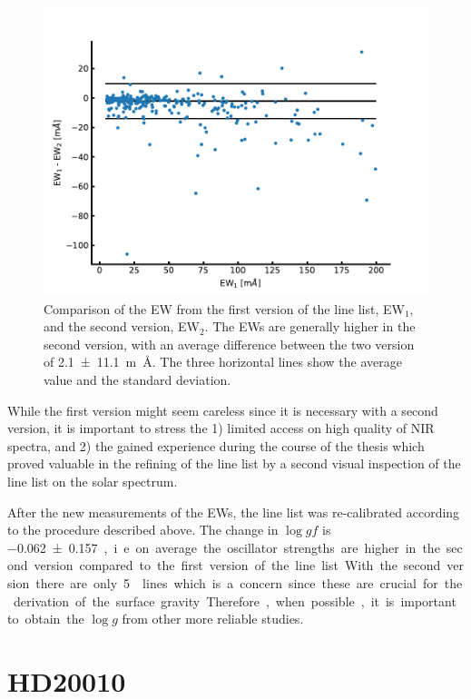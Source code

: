 \begin{figure}[htpb!]
    \centering
    \includegraphics[width=1.0\linewidth]{figures/linelist_comparison.pdf}
    \caption{Comparison of the EW from the first version of the line list, EW$_1$, and the second
             version, EW$_2$. The EWs are generally higher in the second version, with an average
             difference between the two version of \SI{2.1+-11.1}{m\angstrom}. The three horizontal
             lines show the average value and the standard deviation.}
    \label{fig:linelist_comparison}
\end{figure}

While the first version might seem careless since it is necessary with a second version, it is
important to stress the 1) limited access on high quality of NIR spectra, and 2) the gained
experience during the course of the thesis which proved valuable in the refining of the line list
by a second visual inspection of the line list on the solar spectrum.

After the new measurements of the EWs, the line list was re-calibrated according to the procedure
described above. The change in $\log \mathit{gf}$ is \SI{-0.062+-0.157}, i.e. on average the
oscillator strengths are higher in the second version compared to the first version of the line
list.

With the second version there are only 5  lines which is a concern since these are
crucial for the derivation of the surface gravity. Therefore, when possible, it is important to
obtain the $\log g$ from other more reliable studies.


\section{HD20010}
\label{sec:HD20010}

